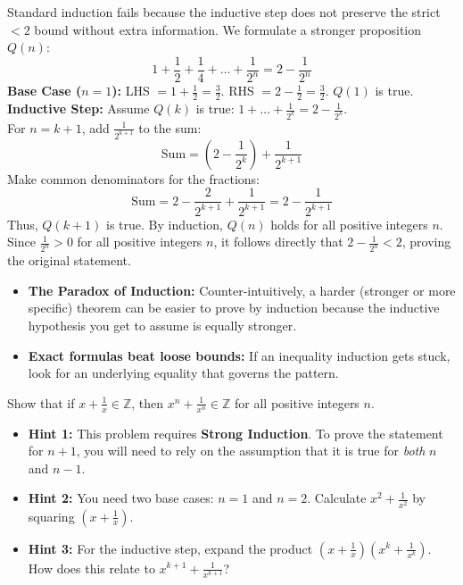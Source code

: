\begin{solution}[Brief]
Standard induction fails because the inductive step does not preserve the strict $< 2$ bound without extra information. We formulate a stronger proposition $Q(n)$:
$$ 1 + \frac{1}{2} + \frac{1}{4} + \dots + \frac{1}{2^n} = 2 - \frac{1}{2^n} $$
\textbf{Base Case ($n=1$):} LHS $= 1 + \frac{1}{2} = \frac{3}{2}$. RHS $= 2 - \frac{1}{2} = \frac{3}{2}$. $Q(1)$ is true.\\
\textbf{Inductive Step:} Assume $Q(k)$ is true: $1 + \dots + \frac{1}{2^k} = 2 - \frac{1}{2^k}$.\\
For $n=k+1$, add $\frac{1}{2^{k+1}}$ to the sum:
$$ \text{Sum} = \left(2 - \frac{1}{2^k}\right) + \frac{1}{2^{k+1}} $$
Make common denominators for the fractions:
$$ \text{Sum} = 2 - \frac{2}{2^{k+1}} + \frac{1}{2^{k+1}} = 2 - \frac{1}{2^{k+1}} $$
Thus, $Q(k+1)$ is true. By induction, $Q(n)$ holds for all positive integers $n$. \\
Since $\frac{1}{2^n} > 0$ for all positive integers $n$, it follows directly that $2 - \frac{1}{2^n} < 2$, proving the original statement.
\end{solution}

\begin{takeaways}
\begin{itemize}
    \item \textbf{The Paradox of Induction:} Counter-intuitively, a harder (stronger or more specific) theorem can be easier to prove by induction because the inductive hypothesis you get to assume is equally stronger.
    \item \textbf{Exact formulas beat loose bounds:} If an inequality induction gets stuck, look for an underlying equality that governs the pattern.
\end{itemize}
\end{takeaways}

\begin{problem}
Show that if $x + \frac{1}{x} \in \mathbb{Z}$, then $x^n + \frac{1}{x^n} \in \mathbb{Z}$ for all positive integers $n$.
\end{problem}

\begin{hint}
\begin{itemize}
    \item \textbf{Hint 1:} This problem requires \textbf{Strong Induction}. To prove the statement for $n+1$, you will need to rely on the assumption that it is true for \textit{both} $n$ and $n-1$.
    \item \textbf{Hint 2:} You need two base cases: $n=1$ and $n=2$. Calculate $x^2 + \frac{1}{x^2}$ by squaring $(x + \frac{1}{x})$.
    \item \textbf{Hint 3:} For the inductive step, expand the product $\left(x + \frac{1}{x}\right)\left(x^k + \frac{1}{x^k}\right)$. How does this relate to $x^{k+1} + \frac{1}{x^{k+1}}$?
\end{itemize}
\end{hint}

